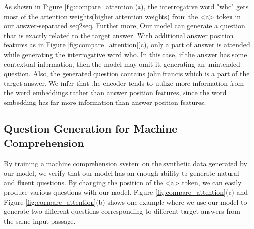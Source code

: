\documentclass[letterpaper]{article} %
\begin{document}
As shown in Figure \ref{fig:compare_attention}(a), the interrogative word "who" gets most of the attention weights(higher attention weights) from the \textless{}a\textgreater{} token in our answer-separated seq2seq. Further more, Our model can generate a question that is exactly related to the target answer. With additional answer position features as in Figure \ref{fig:compare_attention}(c), only a part of answer is attended while generating the interrogative word who. In this case, if the answer has some contextual information, then the model may omit it, generating an unintended question. Also, the generated question contains john francis which is a part of the target answer. We infer that the encoder tends to utilize more information from the word embeddings rather than answer position features, since the word embedding has far more information than answer position features.
%
%
%


\subsection{Question Generation for Machine Comprehension }
By training a machine comprehension system on the synthetic data generated by our model, we verify that our model has an enough ability to generate natural and fluent questions. By changing the position of the \textless a\textgreater{} token, we can easily produce various questions with our model. Figure \ref{fig:compare_attention}(a) and Figure \ref{fig:compare_attention}(b) shows one example where we use our model to generate two different questions corresponding to different target answers from the same input passage.
%
%
\end{document}
